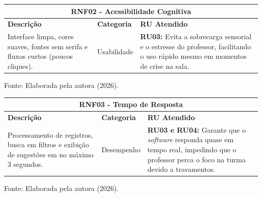 \begin{quadro}[H]
    \centering
    \caption{RNF02: Acessibilidade Cognitiva}
    \label{quadro:rnf02}
    \renewcommand{\arraystretch}{1.5}
    \begin{tabular}{|p{5.5cm}|p{2.5cm}|p{7cm}|}
        \hline
        \multicolumn{3}{|c|}{\textbf{RNF02 - Acessibilidade Cognitiva}} \\ \hline
        \textbf{Descrição} & \textbf{Categoria} & \textbf{RU Atendido} \\ \hline
        Interface limpa, cores suaves, fontes sem serifa e fluxos curtos (poucos cliques). & Usabilidade & \textbf{RU03:} Evita a sobrecarga sensorial e o estresse do professor, facilitando o uso rápido mesmo em momentos de crise na sala. \\ \hline
    \end{tabular}
    
    \vspace{0.1cm}
    \begin{flushleft}
        \footnotesize Fonte: Elaborada pela autora (2026).
    \end{flushleft}
\end{quadro}

\begin{quadro}[H]
    \centering
    \caption{RNF03: Tempo de Resposta}
    \label{quadro:rnf03}
    \renewcommand{\arraystretch}{1.5}
    \begin{tabular}{|p{5.5cm}|p{2.5cm}|p{7cm}|}
        \hline
        \multicolumn{3}{|c|}{\textbf{RNF03 - Tempo de Resposta}} \\ \hline
        \textbf{Descrição} & \textbf{Categoria} & \textbf{RU Atendido} \\ \hline
        Processamento de registros, busca em filtros e exibição de sugestões em no máximo 3 segundos. & Desempenho & \textbf{RU03 e RU04:} Garante que o \textit{software} responda quase em tempo real, impedindo que o professor perca o foco na turma devido a travamentos. \\ \hline
    \end{tabular}
    
    \vspace{0.1cm}
    \begin{flushleft}
        \footnotesize Fonte: Elaborada pela autora (2026).
    \end{flushleft}
\end{quadro}

